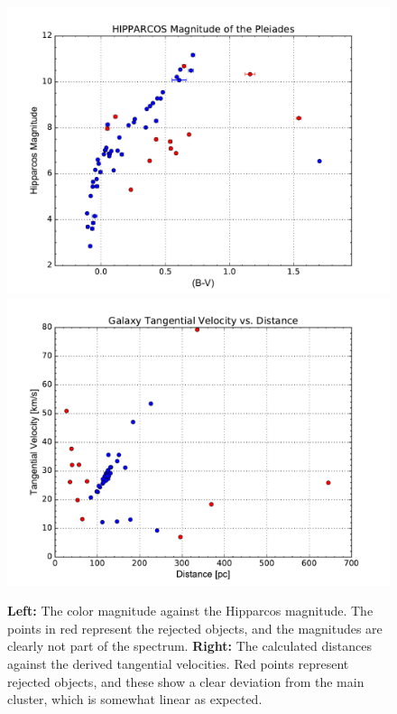\documentclass[onecolumn]{aastex6}
\begin{document}
\begin{figure}[ht]
  \centering
  \includegraphics[scale=0.4]{magnitude.pdf}%
  \includegraphics[scale=0.4]{distancevel.pdf}%

  \caption{\textbf{Left: } The color magnitude against the Hipparcos magnitude. The points in red represent the rejected objects, and the magnitudes are clearly not part of the spectrum. \textbf{Right: } The calculated distances against the derived tangential velocities. Red points represent rejected objects, and these show a clear deviation from the main cluster, which is somewhat linear as expected.}
  \label{distancevel}
\end{figure}
\end{document}
